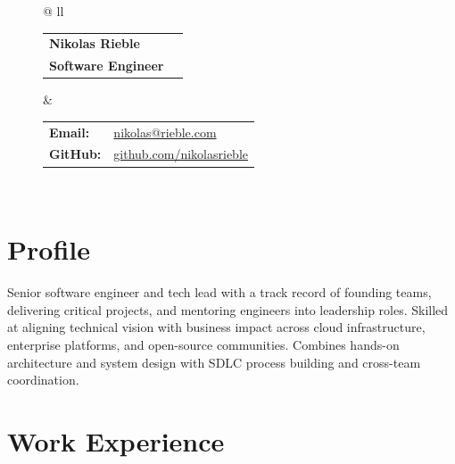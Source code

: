 \documentclass[letterpaper,11pt]{article}
\begin{document}
\addtolength{\tabcolsep}{4pt}    %
{\renewcommand{\arraystretch}{1} %
\begin{figure}[t]
	\centering
	\begin{tabular*}{\textwidth}{@{\extracolsep{\fill}} ll}
		\begin{tabular}{@{}ll@{}}
			\textbf{{\Huge Nikolas Rieble}} \\
			\textbf{Software Engineer} \\
		\end{tabular} &
		\begin{tabular}{@{}ll@{}}
			\textbf{Email:} & \href{mailto:nikolas@rieble.com}{nikolas@rieble.com} \\
			\textbf{GitHub:} & \href{https://github.com/nikolasrieble}{github.com/nikolasrieble} \\
		\end{tabular} \\
	\end{tabular*}
\end{figure}
}

\section{Profile}
Senior software engineer and tech lead with a track record of founding teams, delivering critical projects, and mentoring engineers into leadership roles. Skilled at aligning technical vision with business impact across cloud infrastructure, enterprise platforms, and open-source communities. Combines hands-on architecture and system design with SDLC process building and cross-team coordination.

\section{Work Experience}
\end{document}
